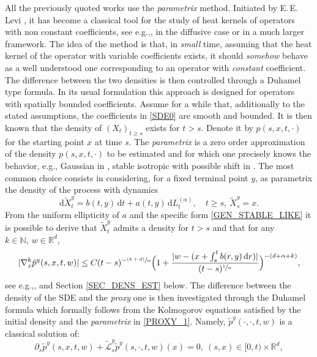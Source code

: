 \documentclass[11pt]{article}
\newcommand{\eg}{e.g.,\xspace}
\numberwithin{equation}{section}\providecommand{\asymp}{\mathrel{\sim}}
\newcommand{\psfrac}[2]{\sfrac{(#1)}{#2}}
\newcommand{\rd}{\mathrm{d}}
\theoremstyle{plain}
\theoremstyle{definition}
\let\p\partial
\newcommand\mN{\mathbb{N}}
\newcommand\mR{\mathbb{R}}
\newcommand\1{{\mathbf{1}}}
\newcommand\sL{{\mathscr L}}
\newcommand{\dif}{\,\mathrm{d}}
\begin{document}
{All the previously quoted works use the \textit{parametrix} method. Initiated by E.\,E.\,Levi \cite{levi:07}, it has become a classical tool for the study of heat kernels of operators with non constant coefficients, see \eg \cite{Friedman}, \cite{mcke:sing:67} in the diffusive case or {\cite{koch:89} in a much larger framework}. The idea of the method is that, in \textit{small} time, assuming that the heat kernel of the operator with variable coefficients exists, it should \textit{somehow} behave as a well understood one corresponding to an operator with \textit{constant} coefficient. The difference between the two densities is then controlled through a Duhamel type formula.
In its usual formulation this approach is designed for operators with spatially bounded coefficients. Assume for a while that, additionally to the stated assumptions, the coefficients in \eqref{SDE0} are smooth and bounded. It is then known that the density of $(X_t)_{t\ge s}$ exists for $t>s$. Denote it by $p(s,x,t,\cdot)$ for the starting point $x$ at time $s$. The \textit{parametrix} is a zero order approximation of the density $p(s,x,t,\cdot) $ to be estimated and for which one precisely knows the behavior, \eg Gaussian in \cite{Friedman}, stable isotropic with possible shift in \cite{kolo:00}. The most common choice consists in considering, for a fixed terminal point $y$, as parametrix the density of the process with dynamics
\begin{equation}\label{PROXY_1}
\rd \tilde X_t^y=b(t,y)\dif t+a(t,y)\dif L^{(\alpha)}_t,\quad t\ge s,\ \tilde X_s^y=x.
\end{equation}
From the uniform ellipticity of $a$ and the specific form \eqref{GEN_STABLE_LIKE} it is possible to derive that
$ \tilde X_t^y$ admits a density for $t>s$ and that for any $k\in \mN,\ w\in \mR^d$,
\begin{align}\label{GRAD_BD_INTRO}
|\nabla_x^k \tilde p^y(s,x,t,w)|\le C (t-s)^{-\psfrac{k+d}\alpha}\Bigl(1+\frac{|w-(x+\int_s^t b(r,y)\dif r )|}{(t-s)^{\sfrac 1\alpha}}\Bigr)^{-(d+\alpha+k)},
\end{align}
see \eg \cite{Be}, \cite{Bo-Ja} and Section \ref{SEC_DENS_EST} below. The difference between the density of the SDE and the \textit{proxy} one is then investigated through the Duhamel formula which formally follows from the Kolmogorov equations satisfied by the initial density and the \textit{parametrix} in \eqref{PROXY_1}. Namely, $\tilde p^y(\cdot,\cdot,t,w) $ is a classical solution of:
\begin{equation}\label{KOLMO_FREEZE_INTRO}
\p_s \tilde p^{y}(s,x,t,w)+{\tilde \sL}^{y}_s{\tilde p}^{y}(s,\cdot,t,w)(x)=0,\ (s,x)\in [0,t)\times \mR^d,

\end{equation}}
\end{document}
